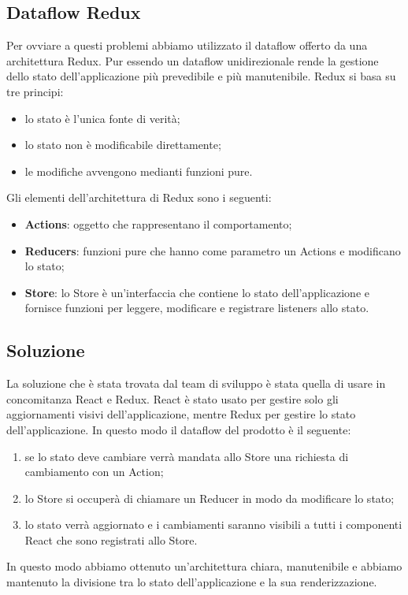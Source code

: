 \subsection{Dataflow Redux}
Per ovviare a questi problemi abbiamo utilizzato il dataflow offerto da una architettura Redux. Pur essendo un dataflow unidirezionale rende la gestione dello stato dell'applicazione più prevedibile e più manutenibile. Redux si basa su tre principi:
\begin{itemize}
	\item lo stato è l'unica fonte di verità;
	\item lo stato non è modificabile direttamente;
	\item le modifiche avvengono medianti funzioni pure.
\end{itemize}
\noindent
Gli elementi dell'architettura di Redux sono i seguenti:
\begin{itemize}
	\item \textbf{Actions}: oggetto che rappresentano il comportamento;
	\item \textbf{Reducers}: funzioni pure che hanno come parametro un Actions e modificano lo stato;
	\item \textbf{Store}: lo Store è un'interfaccia che contiene lo stato dell'applicazione e fornisce funzioni per leggere, modificare e registrare listeners allo stato.
\end{itemize}
\noindent

\subsection{Soluzione}
La soluzione che è stata trovata dal team di sviluppo è stata quella di usare in concomitanza React e Redux. React è stato usato per gestire solo gli aggiornamenti visivi dell'applicazione, mentre Redux per gestire lo stato dell'applicazione.
In questo modo il dataflow del prodotto è il seguente:
\begin{enumerate}
	\item se lo stato deve cambiare verrà mandata allo Store una richiesta di cambiamento con un Action;
	\item lo Store si occuperà di chiamare un Reducer in modo da modificare lo stato;
	\item lo stato verrà aggiornato e i cambiamenti saranno visibili a tutti i componenti React che sono registrati allo Store.
\end{enumerate}
\noindent

In questo modo abbiamo ottenuto un'architettura chiara, manutenibile e abbiamo mantenuto la divisione tra lo stato dell'applicazione e la sua renderizzazione.
